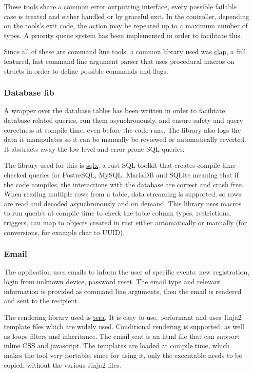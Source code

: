     These tools share a common error outputting interface, every possible failable case is treated and either handled or by graceful exit. In the controller, depending on the tools's exit code, the action may be repeated up to a maximum number of types. A priority queue system has been implemented in order to facilitate this.

    Since all of these are command line tools, a common library used was \hyperref[lib-claprs]{clap}, a full featured, fast command line argument parser that uses procedural macros on structs in order to define possible commands and flags.

    \subsubsection{Database lib}
    A wrapper over the database tables has been written in order to facilitate database related queries, run them asynchronously, and ensure safety and query corectness at compile time, even before the code runs. The library also logs the data it manipulates so it can be manually be reviewed or automatically reverted. It abstracts away the low level and error prone SQL queries.
    
    The library used for this is \hyperref[lib-sqlxrs]{sqlx}, a rust SQL toolkit that creates compile time checked queries for PostreSQL, MySQL, MariaDB and SQLite meaning that if the code compiles, the interactions with the database are correct and crash free. When reading multiple rows from a table, data streaming is supported, so rows are read and decoded asynchronously and on demand. This library uses macros to run queries at compile time to check the table column types, restrictions, triggers, can map to objects created in rust either automatically or manually (for conversions, for example char to UUID).
    
    \subsubsection{Email}
    The application uses emails to inform the user of specific events: new registration, login from unknown device, password reset. The email type and relevant information is provided as command line arguments, then the email is rendered and sent to the recipient.

    The rendering library used is \hyperref[lib-tera]{tera}. It is easy to use, performant and uses Jinja2 template files which are widely used. Conditional rendering is supported, as well as loops filters and inheritance. The email sent is an html file that can support inline CSS and javascript. The templates are loaded at compile time, which makes the tool very portable, since for using it, only the executable needs to be copied, without the various Jinja2 files.

